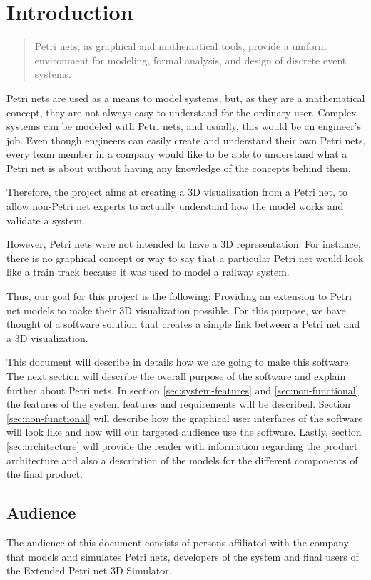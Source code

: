 \section{Introduction}

\begin{quotation}
Petri nets, as graphical and mathematical tools, provide a uniform environment for modeling, formal analysis, and design of discrete event systems. \cite{Zurawski:1994}
\end{quotation}

Petri nets are used as a means to model systems, but, as they are a mathematical concept, they are not always easy to understand for the ordinary user. Complex systems can be modeled with Petri nets, and usually, this would be an engineer's job. Even though engineers can easily create and understand their own Petri nets, every team member in a company would like to be able to understand what a Petri net is about without having any knowledge of the concepts behind them.

Therefore, the project aims at creating a 3D visualization from a Petri net, to allow non-Petri net experts to actually understand how the model works and validate a system.

However, Petri nets were not intended to have a 3D representation. For instance, there is no graphical concept or way to say that a particular Petri net would look like a train track because it was used to model a railway system. 

Thus, our goal for this project is the following: Providing an extension to Petri net models to make their 3D visualization possible. For this purpose, we have thought of a software solution that creates a simple link between a Petri net and a 3D visualization.

This document will describe in details how we are going to make this software. The next section will describe the overall purpose of the software and explain further about Petri nets. In section \ref{sec:system-features} and \ref{sec:non-functional} the features of the system features and requirements will be described. Section \ref{sec:non-functional} will describe how the graphical user interfaces of the software will look like and how will our targeted audience use the software. Lastly, section \ref{sec:architecture} will provide the reader with information regarding the product architecture and also a description of the models for the different components of the final product. 

\subsection{Audience}

The audience of this document consists of persons affiliated with the company that models and simulates Petri nets, developers of the system and final users of the Extended Petri net 3D Simulator.